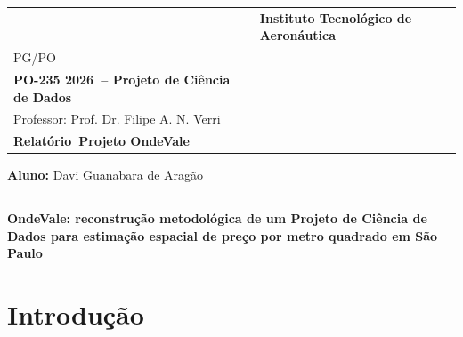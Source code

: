 \documentclass[12pt]{report}
\newcommand{\student}[1]{\def\thestudent{#1}}
\newcommand{\course}[1]{\def\thecourse{#1}}
\newcommand{\coursename}[1]{\def\thecoursename{#1}}
\newcommand{\professor}[1]{\def\theprofessor{#1}}
\newcommand{\activitytype}[1]{\def\theactivitytype{#1}}
\newcommand{\activitynumber}[1]{\def\theactivitynumber{#1}}
\newcommand{\makeheader}{
\noindent
\begin{center}
\begin{tabular}{m{7cm} m{0.5\textwidth}}
    \centering
    
    &
    \raggedright
    \textbf{Instituto Tecnológico de Aeronáutica} \\
    PG/PO \\[0.3em]
    \textbf{\thecourse\ -- \thecoursename} \\
    Professor: \theprofessor \\[0.5em]
    \textbf{\theactivitytype\ \theactivitynumber}
\end{tabular}
\end{center}

\vspace{1cm}

\noindent
\textbf{Aluno:} \thestudent

\vspace{0.5cm}
\hrule
\vspace{0.8cm}
}
\begin{document}
\student{Davi Guanabara de Aragão}
\course{PO-235 2026}
\coursename{Projeto de Ciência de Dados}
\professor{Prof. Dr. Filipe A. N. Verri}
\activitytype{Relatório}
\activitynumber{Projeto OndeVale}

\makeheader

\begin{center}
    {\LARGE \textbf{OndeVale: reconstrução metodológica de um Projeto de Ciência de Dados para estimação espacial de preço por metro quadrado em São Paulo}}\\[1em]
\end{center}

\begin{abstract}
Este relatório reconstrói metodologicamente o projeto OndeVale a partir de quatro fontes complementares: a narrativa conceitual dos slides de apresentação, o livro \textit{Data Science Project: An Inductive Learning Approach}, de Filipe A. N. Verri, o código-fonte do repositório e os artefatos gerados pelo pipeline analítico. O problema abordado consiste em estimar o preço por metro quadrado de imóveis no município de São Paulo utilizando exclusivamente a localização geográfica. A análise mostra que o projeto foi estruturado como um sistema completo de ciência de dados, envolvendo caracterização do dataset, construção de um dataset analítico, busca por solução por meio de KNN, avaliação experimental com validação cruzada, treinamento final, disponibilização via backend e frontend e implantação pública. Os artefatos indicam que a solução final implantada foi um \textit{KNeighborsRegressor} uniforme com $k=5$, treinado sobre coordenadas métricas projetadas em EPSG:31983, e selecionado não apenas por desempenho médio, mas também por coerência metodológica com o uso de distâncias métricas. Também são discutidas fragilidades metodológicas observáveis, como o uso do mesmo protocolo de validação para seleção e estimativa de desempenho, a ausência de \textit{nested cross-validation} e o risco de \textit{leakage} espacial. O texto interpreta o OndeVale como um estudo de caso de Projeto de Ciência de Dados no sentido proposto por Verri: não apenas um modelo treinado, mas um produto completo, reprodutível e publicável.
\end{abstract}

\tableofcontents
\newpage

\chapter{Introdução}
\end{document}
